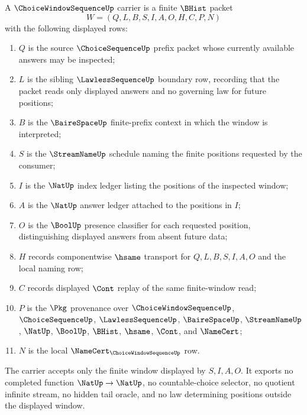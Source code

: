 \begin{definition}
\label{def:choice-window-sequence-carrier}
A $\ChoiceWindowSequenceUp$ carrier is a finite $\BHist$ packet
$$
W=(Q,L,B,S,I,A,O,H,C,P,N)
$$
with the following displayed rows:
\begin{enumerate}
\item $Q$ is the source $\ChoiceSequenceUp$ prefix packet whose currently available answers may be inspected;
\item $L$ is the sibling $\LawlessSequenceUp$ boundary row, recording that the packet reads only displayed answers and no governing law for future positions;
\item $B$ is the $\BaireSpaceUp$ finite-prefix context in which the window is interpreted;
\item $S$ is the $\StreamNameUp$ schedule naming the finite positions requested by the consumer;
\item $I$ is the $\NatUp$ index ledger listing the positions of the inspected window;
\item $A$ is the $\NatUp$ answer ledger attached to the positions in $I$;
\item $O$ is the $\BoolUp$ presence classifier for each requested position, distinguishing displayed answers from absent future data;
\item $H$ records componentwise $\hsame$ transport for $Q,L,B,S,I,A,O$ and the local naming row;
\item $C$ records displayed $\Cont$ replay of the same finite-window read;
\item $P$ is the $\Pkg$ provenance over $\ChoiceWindowSequenceUp$, $\ChoiceSequenceUp$, $\LawlessSequenceUp$, $\BaireSpaceUp$, $\StreamNameUp$, $\NatUp$, $\BoolUp$, $\BHist$, $\hsame$, $\Cont$, and $\NameCert$;
\item $N$ is the local $\NameCert_{\ChoiceWindowSequenceUp}$ row.
\end{enumerate}
The carrier accepts only the finite window displayed by $S,I,A,O$. It exports no completed function $\NatUp \to \NatUp$, no countable-choice selector, no quotient infinite stream, no hidden tail oracle, and no law determining positions outside the displayed window.
\end{definition}

